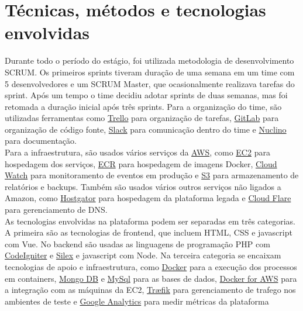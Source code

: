 \section{Técnicas, métodos e tecnologias envolvidas}

Durante todo o período do estágio, foi utilizada metodologia de desenvolvimento \gls{SCRUM}. Os primeiros sprints tiveram duração de uma semana em um time com 5 desenvolvedores e um \gls{SCRUM} Master, que ocasionalmente realizava tarefas do sprint. Após um tempo o time decidiu adotar sprints de duas semanas, mas foi retomada a duração inicial após três sprints. Para a organização do time, são utilizadas ferramentas como \href{https://trello.com/}{Trello} para organização de tarefas, \href{https://gitlab.com}{GitLab} para organização de código fonte, \href{https://slack.com/}{Slack} para comunicação dentro do time e \href{https://www.nuclino.com/}{Nuclino} para documentação.\\

Para a infraestrutura, são usados vários serviços da \href{https://aws.amazon.com/}{\gls{AWS}}, como \href{https://aws.amazon.com/ec2/}{\gls{EC2}} para hospedagem dos serviços, \href{https://aws.amazon.com/ecr/}{\gls{ECR}} para hospedagem de imagens \gls{Docker}, \href{https://aws.amazon.com/cloudwatch/}{Cloud Watch} para monitoramento de eventos em produção e \href{https://aws.amazon.com/s3/}{\gls{S3}} para armazenamento de relatórios e backups. Também são usados vários outros serviços não ligados a Amazon, como \href{https://www.hostgator.com.br/}{Hostgator} para hospedagem da plataforma legada e \href{https://www.cloudflare.com/br/}{Cloud Flare} para gerenciamento de \gls{DNS}.\\

As tecnologias envolvidas na plataforma podem ser separadas em três categorias. A primeira são as tecnologias de \gls{frontend}, que incluem \gls{HTML}, \gls{CSS} e \gls{javascript} com \gls{Vue}. No \gls{backend} são usadas as linguagens de programação \gls{PHP} com \href{https://codeigniter.com/}{CodeIgniter} e \href{https://silex.symfony.com/}{Silex} e \gls{javascript} com \gls{Node}. Na terceira categoria se encaixam tecnologias de apoio e infraestrutura, como \href{https://www.docker.com/}{\gls{Docker}} para a execução dos processos em \glspl{container}, \href{https://www.mongodb.com/}{Mongo DB} e \href{https://www.mysql.com/}{MySql} para as bases de dados, \href{https://docs.docker.com/docker-for-aws/}{\gls{Docker} for \gls{AWS}} para a integração com as máquinas da \gls{EC2}, \href{https://traefik.io/}{Træfik} para gerenciamento de trafego nos ambientes de teste e \href{https://analytics.google.com/analytics/}{Google Analytics} para medir métricas da plataforma\\

